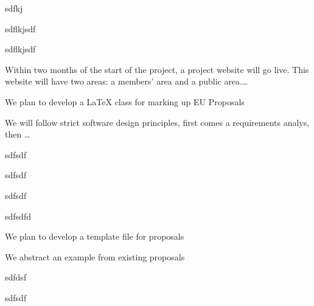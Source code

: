 \begin{workplan}
\begin{workpackage}[id=dissem,title=Dissemination and Exploitation,
RM=8]
 \begin{tasklist}
  \begin{task}[id=t1,wphases=6-7]
    sdfkj
  \end{task}
  \begin{task}[id=t2,wphases=12-13]
    sdflkjsdf
  \end{task}
  \begin{task}[id=t3,wphases=18-19]
    sdflkjsdf
  \end{task}
 \begin{task}[id=t4,wphases=22-24] 
 \end{task}
\end{tasklist}

Within two months of the start of the project, a project website will go live. This
website will have two areas: a members' area and a public area.\ldots
\end{workpackage}
 
\begin{workpackage}[id=class,
   title=A LaTeX class for EU Proposals,short=Class,
  RM=12,RAM=8]

We plan to develop a {\LaTeX} class for marking up EU Proposals

We will follow strict software design principles, first comes a
requirements analys, then \ldots
\begin{tasklist}
  \begin{task}[id=c1,wphases=0-2]
    sdfsdf
  \end{task}
  \begin{task}[id=c2,wphases=4-8]
    sdfsdf
  \end{task}
  \begin{task}[id=c3,wphases=10-14]
    sdfsdf
  \end{task}
  \begin{task}[id=c4,wphases=20-24]
    sdfsdfd
  \end{task}
\end{tasklist}
\end{workpackage} 

\begin{workpackage}[id=temple,title= Proposal Template,
  short=Template,RM=12]

We plan to develop a template file for {\pn} proposals

We abstract an example from existing proposals
\begin{tasklist}
  \begin{task}[id=temple1,wphases=6-12]
    sdfdsf 
  \end{task}
  \begin{task}[id=temple2,wphases=18-24]%
    sdfsdf
  \end{task} 
\end{tasklist}
\end{workpackage}


\end{workplan}
